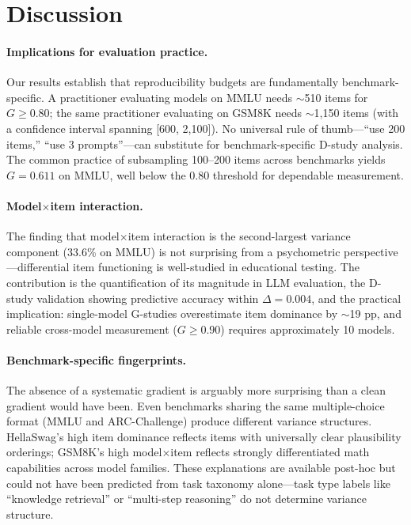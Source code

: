 \documentclass[11pt]{article}
\begin{document}
\section{Discussion}

\paragraph{Implications for evaluation practice.}
Our results establish that reproducibility budgets are fundamentally benchmark-specific.
A practitioner evaluating models on MMLU needs $\sim$510 items for $G \geq 0.80$; the same practitioner evaluating on GSM8K needs $\sim$1{,}150 items (with a confidence interval spanning [600, 2{,}100]).
No universal rule of thumb---``use 200 items,'' ``use 3 prompts''---can substitute for benchmark-specific D-study analysis.
The common practice of subsampling 100--200 items across benchmarks yields $G = 0.611$ on MMLU, well below the 0.80 threshold for dependable measurement.

\paragraph{Model$\times$item interaction.}
The finding that model$\times$item interaction is the second-largest variance component (33.6\% on MMLU) is not surprising from a psychometric perspective---differential item functioning is well-studied in educational testing.
The contribution is the quantification of its magnitude in LLM evaluation, the D-study validation showing predictive accuracy within $\Delta = 0.004$, and the practical implication: single-model G-studies overestimate item dominance by $\sim$19 pp, and reliable cross-model measurement ($G \geq 0.90$) requires approximately 10 models.

\paragraph{Benchmark-specific fingerprints.}
The absence of a systematic gradient is arguably more surprising than a clean gradient would have been.
Even benchmarks sharing the same multiple-choice format (MMLU and ARC-Challenge) produce different variance structures.
HellaSwag's high item dominance reflects items with universally clear plausibility orderings; GSM8K's high model$\times$item reflects strongly differentiated math capabilities across model families.
These explanations are available post-hoc but could not have been predicted from task taxonomy alone---task type labels like ``knowledge retrieval'' or ``multi-step reasoning'' do not determine variance structure.
\end{document}
